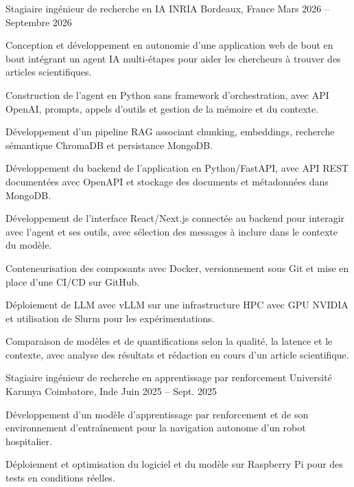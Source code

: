 
\begin{cventries}
  \cventry
    {Stagiaire ingénieur de recherche en IA}
    {INRIA}
    {Bordeaux, France}
    {Mars 2026 -- Septembre 2026}
    {
      \begin{cvitems}
        \item {Conception et développement en autonomie d’une application web de bout en bout intégrant un agent IA multi-étapes pour aider les chercheurs à trouver des articles scientifiques.}
        \item {Construction de l’agent en Python sans framework d’orchestration, avec API OpenAI, prompts, appels d’outils et gestion de la mémoire et du contexte.}
        \item {Développement d’un pipeline RAG associant chunking, embeddings, recherche sémantique ChromaDB et persistance MongoDB.}
        \item {Développement du backend de l’application en Python/FastAPI, avec API REST documentées avec OpenAPI et stockage des documents et métadonnées dans MongoDB.}
        \item {Développement de l’interface React/Next.js connectée au backend pour interagir avec l’agent et ses outils, avec sélection des messages à inclure dans le contexte du modèle.}
        \item {Conteneurisation des composants avec Docker, versionnement sous Git et mise en place d’une CI/CD sur GitHub.}
        \item {Déploiement de LLM avec vLLM sur une infrastructure HPC avec GPU NVIDIA et utilisation de Slurm pour les expérimentations.}
        \item {Comparaison de modèles et de quantifications selon la qualité, la latence et le contexte, avec analyse des résultats et rédaction en cours d’un article scientifique.}
      \end{cvitems}
    }

  \cventry
    {Stagiaire ingénieur de recherche en apprentissage par renforcement}
    {Université Karunya}
    {Coimbatore, Inde}
    {Juin 2025 -- Sept. 2025}
    {
      \begin{cvitems}
        \item {Développement d’un modèle d’apprentissage par renforcement et de son environnement d’entraînement pour la navigation autonome d’un robot hospitalier.}
        \item {Déploiement et optimisation du logiciel et du modèle sur Raspberry Pi pour des tests en conditions réelles.}
      \end{cvitems}
    }
\end{cventries}
